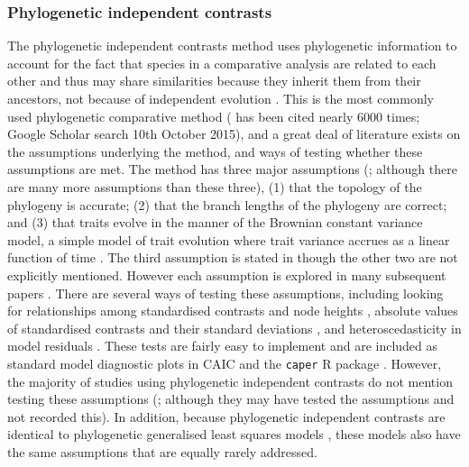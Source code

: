 \documentclass[a4paper,12pt]{article}
\begin{document}
\subsubsection{Phylogenetic independent contrasts}
The phylogenetic independent contrasts method uses phylogenetic information to account for the fact that species in a comparative analysis are related to each other and thus may share similarities because they inherit them from their ancestors, not because of independent evolution \citep{felsenstein1985phylogenies,harvey1991comparative}. 
This is the most commonly used phylogenetic comparative method (\citet{felsenstein1985phylogenies} has been cited nearly 6000 times; Google Scholar search 10th October 2015), and a great deal of literature exists on the assumptions underlying the method, and ways of testing whether these assumptions are met. 
The method has three major assumptions (\citealp{diaz1996testing}; although there are many more assumptions than these three), (1) that the topology of the phylogeny is accurate; (2) that the branch lengths of the phylogeny are correct; and (3) that traits evolve in the manner of the Brownian constant variance model, a simple model of trait evolution where trait variance accrues as a linear function of time \citep{cavalli1967,felsenstein1973maximum}.
The third assumption is stated in \citet{felsenstein1985phylogenies} though the other two are not explicitly mentioned. 
However each assumption is explored in many subsequent papers \citep[e.g.][]{felsenstein1988phylogenies,grafen1989phylogenetic,harvey1991comparative,garland1992procedures,purvis1995comparative,diaz1996testing,hansen1996translating,martins1997phylogenies,freckleton2000phylogenetic,garland2000using,hansen2005assessing,freckleton2006detecting,rohle2006comment}.
There are several ways of testing these assumptions, including looking for relationships among standardised contrasts and node heights \citep{grafen1989phylogenetic,freckleton2006detecting}, absolute values of standardised contrasts and their standard deviations \citep{garland1992procedures,diaz1996testing}, and heteroscedasticity in model residuals \citep{purvis1995mammal}.
These tests are fairly easy to implement and are included as standard model diagnostic plots in CAIC and the \texttt{caper} R package \citep{purvis1995comparative,Orme:2013aa,R-Core-Team:2014aa}.
However, the majority of studies using phylogenetic independent contrasts do not mention testing these assumptions (\citealp{freckleton2006detecting}; although they may have tested the assumptions and not recorded this).
In addition, because phylogenetic independent contrasts are identical to phylogenetic generalised least squares models \citep{garland2000using,rohle2006comment,blomberg2012independent}, these models also have the same assumptions that are equally rarely addressed. 
\end{document}
